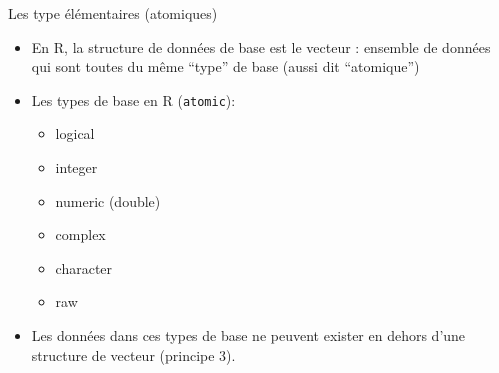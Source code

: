 \documentclass[
  ignorenonframetext,
]{beamer}
\providecommand{\tightlist}{%
  \setlength{\itemsep}{0pt}\setlength{\parskip}{0pt}}
\begin{document}
\begin{frame}[fragile]{Les type élémentaires (atomiques)}
\protect\hypertarget{les-type-uxe9luxe9mentaires-atomiques}{}
\begin{itemize}
\tightlist
\item
  En R, la structure de données de base est le vecteur : ensemble de
  données qui sont toutes du même ``type'' de base (aussi dit
  ``atomique'')
\item
  Les types de base en R (\texttt{atomic}):

  \begin{itemize}
  \tightlist
  \item
    logical
  \item
    integer
  \item
    numeric (double)
  \item
    complex
  \item
    character
  \item
    raw
  \end{itemize}
\item
  Les données dans ces types de base ne peuvent exister en dehors d'une
  structure de vecteur (principe 3).
\end{itemize}
\end{frame}
\end{document}
